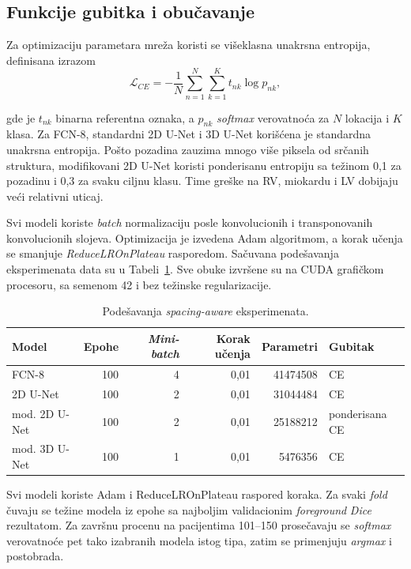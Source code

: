 \documentclass[11pt,a4paper]{article}
\begin{document}
\subsection{Funkcije gubitka i obučavanje}
Za optimizaciju parametara mreža koristi se višeklasna unakrsna entropija, definisana izrazom
\begin{equation}
	\mathcal{L}_{CE}=-\frac{1}{N}\sum_{n=1}^{N}\sum_{k=1}^{K}t_{nk}\log p_{nk},
\end{equation}

gde je $t_{nk}$ binarna referentna oznaka, a $p_{nk}$ \textit{softmax} verovatnoća za $N$ lokacija i $K$
klasa. Za FCN-8, standardni 2D U-Net i 3D U-Net korišćena je standardna unakrsna entropija. Pošto
pozadina zauzima mnogo više piksela od srčanih struktura, modifikovani 2D U-Net koristi ponderisanu
entropiju sa težinom 0,1 za pozadinu i 0,3 za svaku ciljnu klasu. Time greške na RV, miokardu i LV
dobijaju veći relativni uticaj.

\noindent Svi modeli koriste \textit{batch} normalizaciju posle konvolucionih i transponovanih
konvolucionih slojeva. Optimizacija je izvedena Adam algoritmom, a korak učenja se smanjuje
\textit{ReduceLROnPlateau} rasporedom. Sačuvana podešavanja eksperimenata data su u
Tabeli~\ref{tab:training}. Sve obuke izvršene su na CUDA grafičkom procesoru, sa semenom 42 i bez
težinske regularizacije.

\begin{table}[H]
	\centering
	\caption{Podešavanja \textit{spacing-aware} eksperimenata.}
	\label{tab:training}
	\begin{tabular}{lrrrrl}
		\toprule
		Model         & Epohe & \textit{Mini-batch} & Korak učenja & Parametri      & Gubitak        \\
		\midrule
		FCN-8         & 100   & 4          & 0,01         & \num{41474508} & CE             \\
		2D U-Net      & 100   & 2          & 0,01         & \num{31044484} & CE             \\
		mod. 2D U-Net & 100   & 2          & 0,01         & \num{25188212} & ponderisana CE \\
		mod. 3D U-Net & 100   & 1          & 0,01         & \num{5476356}  & CE             \\
		\bottomrule
	\end{tabular}
\end{table}

Svi modeli koriste Adam i ReduceLROnPlateau raspored koraka. Za svaki \textit{fold} čuvaju se težine modela
iz epohe sa najboljim validacionim \textit{foreground} \textit{Dice} rezultatom. Za završnu procenu na pacijentima
101--150 prosečavaju se \textit{softmax} verovatnoće pet tako izabranih modela istog tipa, zatim se
primenjuju \textit{argmax} i postobrada.
\end{document}
